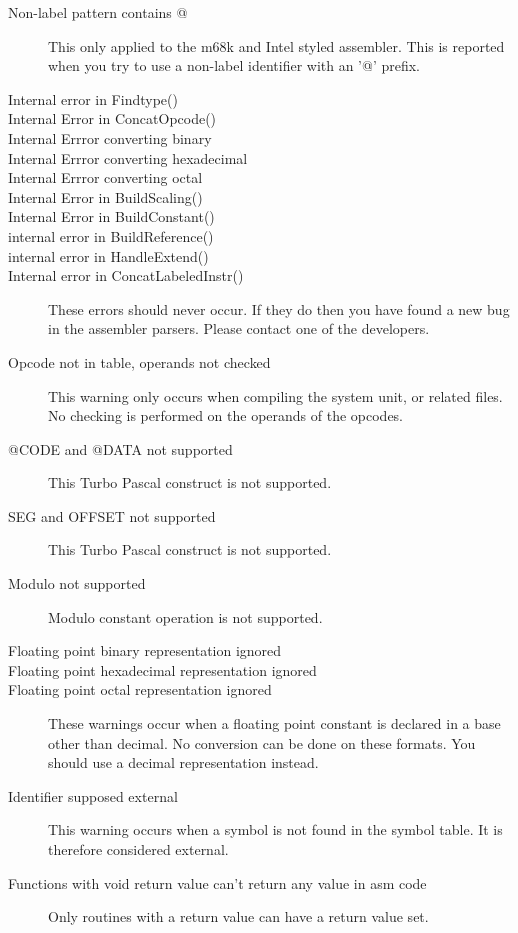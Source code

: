 \begin{description}
\item [Non-label pattern contains @]
This only applied to the m68k and Intel styled assembler.
This is reported when you try to use a non-label identifier with an '@' prefix.
\item [Internal error in Findtype()]
\item [Internal Error in ConcatOpcode()]
\item [Internal Errror converting binary]
\item [Internal Errror converting hexadecimal]
\item [Internal Errror converting octal]
\item [Internal Error in BuildScaling()]
\item [Internal Error in BuildConstant()]
\item [internal error in BuildReference()]
\item [internal error in HandleExtend()]
\item [Internal error in ConcatLabeledInstr()]
\label{InternalError}
These errors should never occur. If they do then you have found
a new bug in the assembler parsers. Please contact one of the
developers.
\item [Opcode not in table, operands not checked]
This warning only occurs when compiling the system unit, or related
files. No checking is performed on the operands of the opcodes.

\item [@CODE and @DATA not supported]
This Turbo Pascal construct is not supported.
\item [SEG and OFFSET not supported]
This Turbo Pascal construct is not supported.
\item [Modulo not supported]
Modulo constant operation is not supported.
\item [Floating point binary representation ignored]
\item [Floating point hexadecimal representation ignored]
\item [Floating point octal representation ignored]
These warnings occur when a floating point constant is declared in
a base other than decimal. No conversion can be done on these formats.
You should use a decimal representation instead.
\item [Identifier supposed external]
This warning occurs when a symbol is not found in the symbol table.
It is therefore considered external.
\item [Functions with void return value can't return any value in asm code]
Only routines with a return value can have a return value set.


\end{description}
